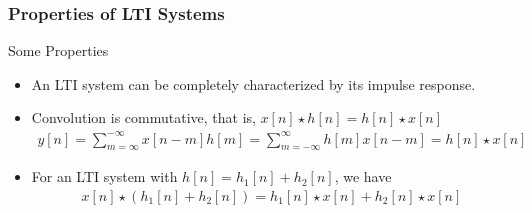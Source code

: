 \documentclass[mathserif,9pt]{beamer}
\begin{document}
\begin{frame}\frametitle{Properties of LTI Systems}\small

  \begin{exampleblock}{Some Properties}
  \begin{itemize}
    \item An LTI system can be completely characterized by its impulse response.  
    \item Convolution is commutative, that is, $x[n] \star h[n] = h[n] \star x[n]$
      \begin{align}
        y[n] = \sum_{m=\infty}^{-\infty}{x[n-m]h[m]} = \sum_{m=-\infty}^{\infty}{h[m]x[n-m]} = h[n] \star x[n]
        \nonumber
      \end{align}
    \item For an LTI system with $h[n] = h_1[n] + h_2[n]$, we have
      \begin{align}
        x[n] \star \left( h_1[n] + h_2[n] \right) = h_1[n] \star x[n] + h_2[n] \star x[n]
        \nonumber
      \end{align}
  \end{itemize}
  \end{exampleblock}
\end{frame}
\end{document}
